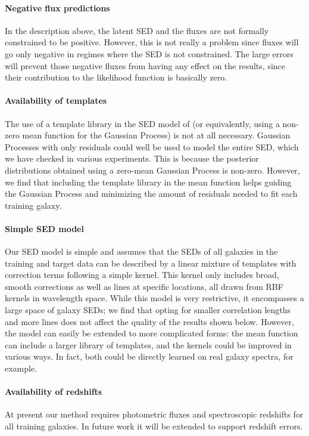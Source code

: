 \documentclass[aps,prd,showpacs,superscriptaddress,groupedaddress]{revtex4}  %
\begin{document}
\paragraph{Negative flux predictions}
In the description above, the latent SED and the fluxes are not formally constrained to be positive. 
However, this is not really a problem since fluxes will go only negative in regimes where the SED is not constrained.
The large errors will prevent those negative fluxes from having any effect on the results, since their contribution to the likelihood function is basically zero.

\paragraph{Availability of templates} 
The use of a template library in the SED model of  (or equivalently, using a non-zero mean function for the Gaussian Process) is not at all necessary.
Gaussian Processes with only residuals could well be used to model the entire SED, which we have checked in  various experiments.
This is because the posterior distributions obtained using a zero-mean Gaussian Process is non-zero.
However, we find that including the template library in the mean function helps guiding the Gaussian Process and minimizing the amount of residuals needed to fit each training galaxy.

\paragraph{Simple SED model}
Our SED model is simple and assumes that the SEDs of all galaxies in the training and target data can be described by a linear mixture of templates with correction terms following a simple kernel.
This kernel only includes broad, smooth corrections as well as lines at specific locations, all drawn from RBF kernels in wavelength space.
While this model is very restrictive, it encompasses a large space of galaxy SEDs; we find that opting for smaller correlation lengths and more lines does not affect the quality of the results shown below.
However, the model can easily be extended to more complicated forms: the mean function can include a larger library of templates, and the kernels could be improved in various ways. 
In fact, both could be directly learned on real galaxy spectra, for example.

\paragraph{Availability of redshifts} 
At present our method requires photometric fluxes and spectroscopic redshifts for all training galaxies. 
In future work it will be extended to support redshift errors. 
\end{document}
